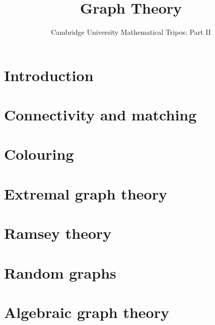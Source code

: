\documentclass{article}
\title{Graph Theory}
\author{Cambridge University Mathematical Tripos: Part II}
\begin{document}
\maketitle

\tableofcontentsnewpage{}

\section{Introduction}

\section{Connectivity and matching}

\section{Colouring}

\section{Extremal graph theory}

\section{Ramsey theory}

\section{Random graphs}

\section{Algebraic graph theory}

\end{document}
